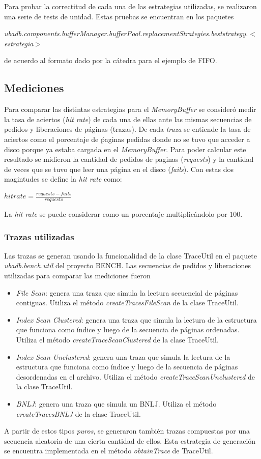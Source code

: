 Para probar la correctitud de cada una de las estrategias utilizadas, se realizaron una serie de tests de unidad. Estas pruebas se encuentran en los paquetes

\textit{ubadb.components.bufferManager.bufferPool.replacementStrategies.beststrategy.$<$estrategia$>$}

de acuerdo al formato dado por la c\'atedra para el ejemplo de FIFO.


\subsection{Mediciones}
Para comparar las distintas estrategias para el \textit{MemoryBuffer} se consider\'o medir
la tasa de aciertos (\textit{hit rate}) de cada una de ellas ante las mismas secuencias 
de pedidos y liberaciones de p\'aginas (trazas). De cada \textit{traza} se entiende la tasa
de aciertos como el porcentaje de \'paginas pedidas donde no se tuvo que acceder a disco
porque ya estaba cargada en el \textit{MemoryBuffer}. Para poder calcular este resultado
se midieron la cantidad de pedidos de paginas (\textit{requests}) y la cantidad de veces
que se tuvo que leer una p\'agina en el disco (\textit{fails}). Con estas dos magintudes
se define la \textit{hit rate} como: \\
\begin{center}
$hit rate = \frac{requests-fails}{requests}$  
\end{center}
La \textit{hit rate} se puede considerar como un porcentaje multiplic\'andolo por $100$.

\subsubsection{Trazas utilizadas}
Las trazas se generan usando la funcionalidad de la clase TraceUtil en el paquete \textit{ubadb.bench.util} del proyecto BENCH. 
Las secuencias de pedidos y liberaciones utilizadas para comparar las mediciones fueron
\begin{itemize}
\item \textit{File Scan}: genera una traza que simula la lectura secuencial de p\'aginas contiguas. Utiliza el m\'etodo \textit{createTracesFileScan} de la clase TraceUtil.
\item \textit{Index Scan Clustered}: genera una traza que simula la lectura de la estructura que funciona como \'indice y luego de la secuencia de p\'aginas ordenadas. Utiliza el m\'etodo \textit{createTraceScanClustered} de la clase TraceUtil.
\item \textit{Index Scan Unclustered}: genera una traza que simula la lectura de la estructura que funciona como \'indice y luego de la secuencia de p\'aginas desordenadas en el archivo. Utiliza el m\'etodo \textit{createTraceScanUnclustered} de la clase TraceUtil.
\item \textit{BNLJ}: genera una traza que simula un BNLJ. Utiliza el m\'etodo \textit{createTracesBNLJ} de la clase TraceUtil.
\end{itemize}

A partir de estos tipos \textit{puros}, se generaron tambi\'en trazas compuestas por una secuencia aleatoria de una cierta cantidad de ellos. Esta estrategia de generaci\'on se encuentra implementada en el m\'etodo \textit{obtainTrace} de TraceUtil.
